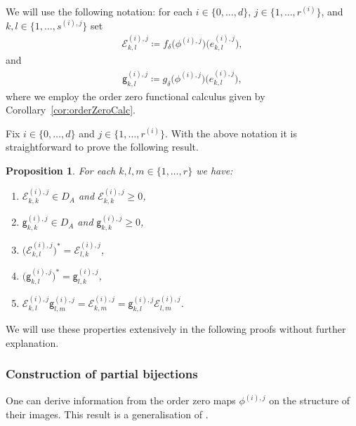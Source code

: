 \documentclass[a4paper]{amsart}
\numberwithin{equation}{section}
\newcommand{\Ecal}{\mathcal{E}}
\newcommand{\unitsimgO}[3]{ {#1}\big({#2}\big) \big( {#3} \big)}
\newcommand{\unMatImg}[3]{{\Ecal_{#3}^{(#1), #2}}}
\newcommand{\gUnMatImg}[3]{{ \mathsf{g}_{#3}^{(#1), #2}}}
\theoremstyle{plain}
\newtheorem{propo}[thm]{Proposition}
\theoremstyle{indented}
\numberwithin{equation}{section}
\theoremstyle{definition}
\theoremstyle{remark}
\theoremstyle{plain}
\theoremstyle{definition}
\begin{document}
We will use the following notation:
for each ${i\in \{0,\hdots,d\}}$, 
${j\in \{ 1,\hdots,r^{(i)}\}}$, 
and ${k,l \in \{ 1,\hdots,s^{(i),j}\}}$
set
\begin{align}
        \unMatImg{i}{j}{k,l} \coloneq \unitsimgO{f_\delta}{\phi^{(i),j}}{e_{k,l}^{(i),j}},
\end{align}
and
\begin{align}
         \gUnMatImg{i}{j}{k,l} \coloneq \unitsimgO{g_\delta}{\phi^{(i),j}}{e_{k,l}^{(i),j}},
\end{align}
where we employ the order zero functional calculus given by Corollary~\ref{cor:orderZeroCalc}.

Fix ${i\in \{0,\hdots,d\}}$ and ${j\in \{ 1,\hdots,r^{(i)}\}}$. 
With the above notation it is straightforward to prove the following result.
\begin{propo} \label{prop:unMatImgProperties} 
        For each ${k,l,m \in \{1, \hdots , r\}}$  we have:
     \begin{enumerate}
            \item[\textup{(i)}] 
            $\unMatImg{i}{j}{k,k}\in D_A$ and $\unMatImg{i}{j}{k,k} \ge 0$, 
            \item[\textup{(ii)}] 
             $\gUnMatImg{i}{j}{k,k}\in D_A$ and $\gUnMatImg{i}{j}{k,k} \ge 0$,
            \item[\textup{(iii)}] $\big(\unMatImg{i}{j}{k,l}\big)^{\ast} =\unMatImg{i}{j}{l,k}$,
            \item[\textup{(iv)}] $\big(\gUnMatImg{i}{j}{k,l}\big)^{\ast} = \gUnMatImg{i}{j}{l,k}$,
            \item[\textup{(v)}] $\unMatImg{i}{j}{k,l}
            \gUnMatImg{i}{j}{l,m } = 
            \unMatImg{i}{j}{k,m} 
            =\gUnMatImg{i}{j}{k,l}
            \unMatImg{i}{j}{l,m }$.
        \end{enumerate}
\end{propo}
\noindent
We will use these properties extensively in the following proofs without further explanation.

\smallskip
\subsubsection{Construction of partial bijections}
One can derive information from the order zero maps ${\phi^{(i),j}}$ on the structure of their images.
This result is a generalisation of \cite[Lemma~5.6]{LiLiaoWinter2023diagDim}.
\end{document}
